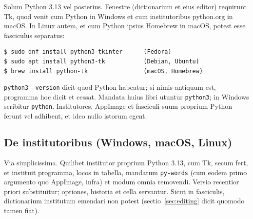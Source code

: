 \documentclass[12pt,
              article,
              oneside
              ]{memoir}
\begin{document}
%
Solum Python 3.13 vel posterius. Fenestre (dictionarium et eius editor)
requirunt Tk, quod venit cum Python in Windows et cum institutoribus
python.org in macOS. In Linux autem, et cum Python ipsius Homebrew in
macOS, potest esse fasciculus separatus:

\begin{verbatim}
$ sudo dnf install python3-tkinter      (Fedora)
$ sudo apt install python3-tk           (Debian, Ubuntu)
$ brew install python-tk                (macOS, Homebrew)
\end{verbatim}

\noindent
\texttt{python3 --version} dicit quod Python habeatur; si nimis antiquum
est, programma hoc dicit et cessat. Mandata huius libri utuntur
\texttt{python3}; in Windows scribitur \texttt{python}. Institutores,
AppImage et fasciculi suum proprium Python ferunt vel adhibent, et ideo
nullo istorum egent.

\subsection{De institutoribus (Windows, macOS, Linux)}
\label{sec:installers}

%
Via simplicissima. Quilibet institutor proprium Python 3.13, cum Tk, secum
fert, et instituit programma, locos in tabella, mandatum
\texttt{py-words} (cum eodem primo argumento quo AppImage, infra) et modum
omnia removendi. Versio recentior priori substituitur; optiones, historia
et cella servantur. Sicut in fasciculis, dictionarium institutum emendari
non potest (sectio~\ref{sec:editing} dicit quomodo tamen fiat).
\end{document}
